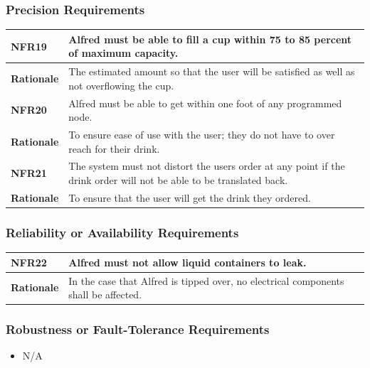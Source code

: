 \documentclass [11pt]{article}
\begin{document}
\subsubsection{Precision Requirements}

\begin{longtable}{| p{ } | p{ } | }\hline 
\rowcolor{tableCell}\textbf{NFR19} & Alfred must be able to fill a cup within 75 to 85 percent of maximum capacity.\\ \hline
\textbf{Rationale} & The estimated amount so that the user will be satisfied as well as not overflowing the cup.\\ \hline 
\rowcolor{tableCell}\textbf{NFR20} & Alfred must be able to get within one foot of any programmed node. \\ \hline
\textbf{Rationale} & To ensure ease of use with the user; they do not have to over reach for their drink. \\ \hline
\rowcolor{tableCell}\textbf{NFR21} & The system must not distort the users order at any point if the drink order will not be able to be translated back. \\ \hline
\textbf{Rationale} & To ensure that the user will get the drink they ordered.\\ \hline	
\end{longtable}


\pagebreak
\subsubsection{Reliability or Availability Requirements}

\begin{longtable}{| p{ } | p{ } | }\hline 
\rowcolor{tableCell}\textbf{NFR22} &  Alfred must not allow liquid containers to leak. \\ \hline
\textbf{Rationale} & In the case that Alfred is tipped over, no electrical components shall be affected.\\ \hline 
\end{longtable}

\subsubsection{Robustness or Fault-Tolerance Requirements }
	\begin{itemize}
		\item N/A
	\end{itemize}
\end{document}
